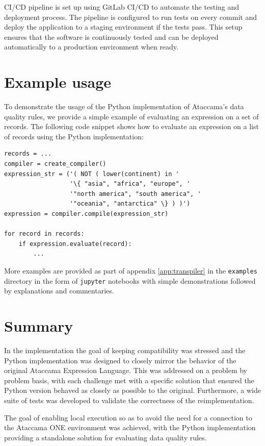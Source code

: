 CI/CD pipeline is set up using GitLab CI/CD to automate the testing and deployment process. The pipeline is configured to run tests on every commit and deploy the application to a staging environment if the tests pass. This setup ensures that the software is continuously tested and can be deployed automatically to a production environment when ready.


\section{Example usage}

To demonstrate the usage of the Python implementation of Ataccama's data quality rules, we provide a simple example of evaluating an expression on a set of records. The following code snippet shows how to evaluate an expression on a list of records using the Python implementation:

\begin{verbatim}
records = ...
compiler = create_compiler()
expression_str = ('( NOT ( lower(continent) in '
                  '\{ "asia", "africa", "europe", '
                  '"north america", "south america", '
                  '"oceania", "antarctica" \} ) )')
expression = compiler.compile(expression_str)

for record in records:
    if expression.evaluate(record):
        ...
\end{verbatim}

More examples are provided as part of appendix \ref{app:transpiler} in the \texttt{examples} directory in the form of \texttt{jupyter} \cite{jupyter} notebooks with simple demonstrations followed by explanations and commentaries. 

\section{Summary}

In the implementation the goal of keeping compatibility was stressed and the Python implementation was designed to closely mirror the behavior of the original Ataccama Expression Language. This was addressed on a problem by problem basis, with each challenge met with a specific solution that ensured the Python version behaved as closely as possible to the original. Furthermore, a wide suite of tests was developed to validate the correctness of the reimplementation.

The goal of enabling local execution so as to avoid the need for a connection to the Ataccama ONE environment was achieved, with the Python implementation providing a standalone solution for evaluating data quality rules.